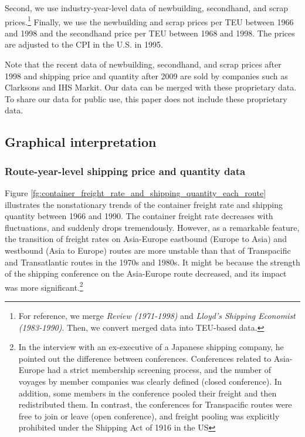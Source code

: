 \documentclass[11pt]{article}
\begin{document}
Second, we use industry-year-level data of newbuilding, secondhand, and scrap prices.\footnote{For reference, we merge \textit{Review (1971-1998)} and \textit{Lloyd's Shipping Economist (1983-1990)}. Then, we convert merged data into TEU-based data.} Finally, we use the newbuilding and scrap prices per TEU between 1966 and 1998 and the secondhand price per TEU between 1968 and 1998. The prices are adjusted to the CPI in the U.S. in 1995. 

Note that the recent data of newbuilding, secondhand, and scrap prices after 1998 and shipping price and quantity after 2009 are sold by companies such as Clarksons and IHS Markit. Our data can be merged with these proprietary data. To share our data for public use, this paper does not include these proprietary data.

\subsection{Graphical interpretation}\label{subsec:graphical_interpretation}
\subsubsection{Route-year-level shipping price and quantity data}



Figure \ref{fg:container_freight_rate_and_shipping_quantity_each_route} illustrates the nonstationary trends of the container freight rate and shipping quantity between 1966 and 1990. The container freight rate decreases with fluctuations, and suddenly drops tremendously. However, as a remarkable feature, the transition of freight rates on Asia-Europe eastbound (Europe to Asia) and westbound (Asia to Europe) routes are more unstable than that of Transpacific and Transatlantic routes in the 1970s and 1980s. It might be because the strength of the shipping conference on the Asia-Europe route decreased, and its impact was more significant.\footnote{In the interview with an ex-executive of a Japanese shipping company, he pointed out the difference between conferences. Conferences related to Asia-Europe had a strict membership screening process, and the number of voyages by member companies was clearly defined (closed conference). In addition, some members in the conference pooled their freight and then redistributed them. In contrast, the conferences for Transpacific routes were free to join or leave (open conference), and freight pooling was explicitly prohibited under the Shipping Act of 1916 in the US} 
\end{document}
